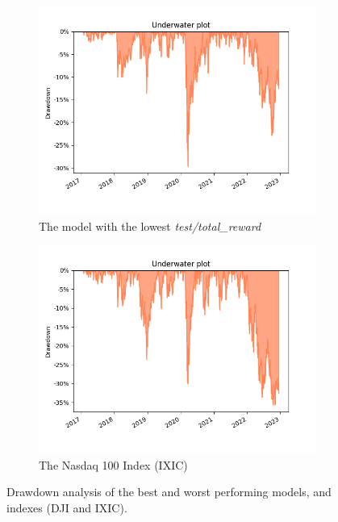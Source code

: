 \documentclass[../xlapes02]{subfiles}
\begin{document}
\begin{figure}[H]
        \vspace{0.5cm}

        \begin{subfigure}[t]{\experimentimgwidth\textwidth}
            \centering
            \includegraphics[width=\linewidth]{image/figure/drawdown_underwater_min}
            \caption{The model with the lowest \emph{test/total\_reward}
            \label{fig:drawdown_underwater_min}}
        \end{subfigure}
        \hfill
        \begin{subfigure}[t]{\experimentimgwidth\textwidth}
            \centering
            \includegraphics[width=\linewidth]{image/figure/drawdown_underwater_ixic}
            \caption{The Nasdaq 100 Index (IXIC)}
            \label{fig:drawdown_underwater_ixic}
        \end{subfigure}

        \caption{Drawdown analysis of the best and worst performing models, and indexes (DJI and IXIC).}
        \label{fig:drawdown}
    \end{figure}
\end{document}
